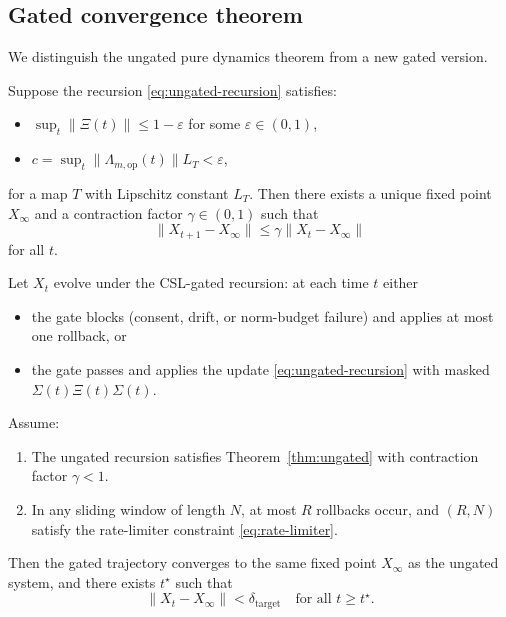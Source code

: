 \documentclass[11pt]{article}
\begin{document}
\subsection{Gated convergence theorem}

We distinguish the ungated pure dynamics theorem from a new gated version.

\begin{theorem}\label{thm:ungated}
Suppose the recursion \eqref{eq:ungated-recursion} satisfies:
\begin{itemize}
    \item $\sup_t \|\Xi(t)\| \le 1 - \varepsilon$ for some $\varepsilon \in (0,1)$,
    \item $c = \sup_t \|\Lambda_{m,\mathrm{op}}(t)\| L_T < \varepsilon$,
\end{itemize}
for a map $T$ with Lipschitz constant $L_T$. Then there exists a unique fixed
point $X_\infty$ and a contraction factor $\gamma \in (0,1)$ such that
\[
\|X_{t+1} - X_\infty\| \le \gamma \|X_t - X_\infty\|
\]
for all $t$.
\end{theorem}

\begin{theorem}\label{thm:gated}
Let $X_t$ evolve under the CSL-gated recursion: at each time $t$ either

\begin{itemize}
    \item the gate blocks (consent, drift, or norm-budget failure) and applies
    at most one rollback, or
    \item the gate passes and applies the update \eqref{eq:ungated-recursion}
    with masked $\Sigma(t)\Xi(t)\Sigma(t)$.
\end{itemize}

Assume:
\begin{enumerate}
    \item The ungated recursion satisfies Theorem~\ref{thm:ungated} with
    contraction factor $\gamma < 1$.
    \item In any sliding window of length $N$, at most $R$ rollbacks occur, and
    $(R,N)$ satisfy the rate-limiter constraint \eqref{eq:rate-limiter}.
\end{enumerate}
Then the gated trajectory converges to the same fixed point $X_\infty$ as the
ungated system, and there exists $t^\star$ such that
\[
\|X_t - X_\infty\| < \delta_{\mathrm{target}} \quad \text{for all } t \ge t^\star.
\]
\end{theorem}
\end{document}
